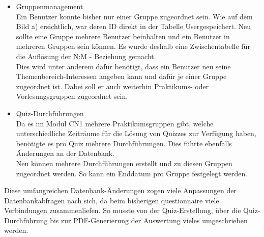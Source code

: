 \begin{itemize}
	\item Gruppenmanagement\\
	Ein Benutzer konnte bisher nur einer Gruppe zugeordnet sein. Wie auf dem Bild a) ersichtlich, war deren ID direkt in der Tabelle \glqq User\grqq gespeichert. Neu sollte eine Gruppe mehrere Benutzer beinhalten und ein Benutzer in mehreren Gruppen sein können. Es wurde deshalb eine Zwischentabelle für die Auflösung der N:M - Beziehung gemacht.\\
	Dies wird unter anderem dafür benötigt, dass ein Benutzer neu seine Themenbereich-Interessen angeben kann und dafür je einer Gruppe zugeordnet ist. Dabei soll er auch weiterhin Praktikums- oder Vorlesungsgruppen zugeordnet sein.
	\item Quiz-Durchführungen\\
	Da es im Modul \gls{CN1} mehrere Praktikumsgruppen gibt, welche unterschiedliche Zeiträume für die Lösung von Quizzes zur Verfügung haben, benötigte es pro Quiz mehrere Durchführungen. Dies führte ebenfalls Änderungen an der Datenbank. \\
	Neu können mehrere Durchführungen erstellt und zu diesen Gruppen zugeordnet werden. So kann ein Enddatum pro Gruppe festgelegt werden.
	
\end{itemize}

Diese umfangreichen Datenbank-Änderungen zogen viele Anpassungen der Datenbankabfragen nach sich, da beim bisherigen questionnaire viele Verbindungen zusammenliefen. So musste von der Quiz-Erstellung, über die Quiz-Durchführung bis zur PDF-Generierung der Auswertung vieles umgeschrieben werden.
